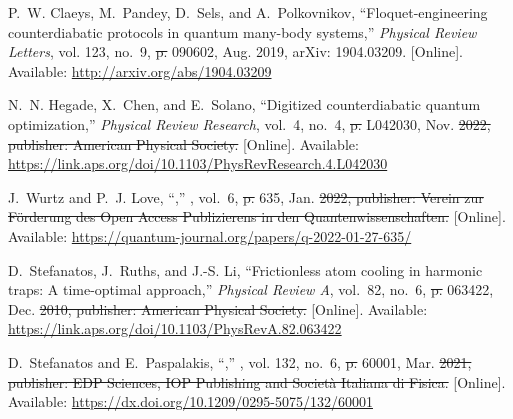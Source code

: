 \documentclass[a4paper,oneside,11pt]{book}
\providecommand{\DIFaddtex}[1]{{\protect\color{blue}\uwave{#1}}} %
\providecommand{\DIFdeltex}[1]{{\protect\color{red}\sout{#1}}}                      %
\providecommand{\DIFaddbegin}{} %
\providecommand{\DIFaddend}{} %
\providecommand{\DIFdelbegin}{} %
\providecommand{\DIFdelend}{} %
\providecommand{\DIFadd}[1]{\texorpdfstring{\DIFaddtex{#1}}{#1}} %
\providecommand{\DIFdel}[1]{\texorpdfstring{\DIFdeltex{#1}}{}} %
\newcommand{\DIFscaledelfig}{0.5}
\newlength{\DIFdelgraphicswidth} %
\newlength{\DIFdelgraphicsheight} %
\newcommand{\DIFaddincludegraphics}[2][]{{\color{blue}\fbox{\DIFOincludegraphics[#1]{#2}}}} %
\newcommand{\DIFdelincludegraphics}[2][]{%
\sbox{\DIFdelgraphicsbox}{\DIFOincludegraphics[#1]{#2}}%
\settoboxwidth{\DIFdelgraphicswidth}{\DIFdelgraphicsbox} %
\settoboxtotalheight{\DIFdelgraphicsheight}{\DIFdelgraphicsbox} %
\scalebox{\DIFscaledelfig}{%
\parbox[b]{\DIFdelgraphicswidth}{\usebox{\DIFdelgraphicsbox}\\[-\baselineskip] \rule{\DIFdelgraphicswidth}{0em}}\llap{\resizebox{\DIFdelgraphicswidth}{\DIFdelgraphicsheight}{%
\setlength{\unitlength}{\DIFdelgraphicswidth}%
\begin{picture}(1,1)%
\thicklines\linethickness{2pt} %
{\color[rgb]{1,0,0}\put(0,0){\framebox(1,1){}}}%
{\color[rgb]{1,0,0}\put(0,0){\line( 1,1){1}}}%
{\color[rgb]{1,0,0}\put(0,1){\line(1,-1){1}}}%
\end{picture}%
}\hspace*{3pt}}} %
} %
\DeclareRobustCommand{\DIFaddbegin}{\DIFOaddbegin \let\includegraphics\DIFaddincludegraphics} %
\DeclareRobustCommand{\DIFaddend}{\DIFOaddend \let\includegraphics\DIFOincludegraphics} %
\DeclareRobustCommand{\DIFdelbegin}{\DIFOdelbegin \let\includegraphics\DIFdelincludegraphics} %
\DeclareRobustCommand{\DIFdelend}{\DIFOaddend \let\includegraphics\DIFOincludegraphics} %
\begin{document}
\begin{thebibliography}{100}
\BIBentryALTinterwordspacing
P.~W. Claeys, M.~Pandey, D.~Sels, and A.~Polkovnikov, ``Floquet-engineering
  counterdiabatic protocols in quantum many-body systems,'' \emph{Physical
  Review Letters}, vol. 123, no.~9,  \DIFdelbegin \DIFdel{p. }\DIFdelend 090602, Aug. 2019, arXiv: 1904.03209.
  [Online]. Available: \url{http://arxiv.org/abs/1904.03209}
\BIBentrySTDinterwordspacing

\BIBentryALTinterwordspacing
N.~N. Hegade, X.~Chen, and E.~Solano, ``Digitized counterdiabatic quantum
  optimization,'' \emph{Physical Review Research}, vol.~4, no.~4,  \DIFdelbegin \DIFdel{p. }\DIFdelend L042030,
  Nov. \DIFdelbegin \DIFdel{2022, publisher: American Physical Society. }\DIFdelend \DIFaddbegin \DIFadd{2022. }\DIFaddend [Online]. Available:
  \url{https://link.aps.org/doi/10.1103/PhysRevResearch.4.L042030}
\BIBentrySTDinterwordspacing

\BIBentryALTinterwordspacing
J.~Wurtz and P.~J. Love, ``,''
  \emph{}, vol.~6,  \DIFdelbegin \DIFdel{p. }\DIFdelend 635, Jan. \DIFdelbegin \DIFdel{2022,
  publisher: Verein zur Förderung des Open Access Publizierens in den
  Quantenwissenschaften. }\DIFdelend \DIFaddbegin \DIFadd{2022.
  }\DIFaddend [Online]. Available:
  \url{https://quantum-journal.org/papers/q-2022-01-27-635/}
\BIBentrySTDinterwordspacing

\BIBentryALTinterwordspacing
D.~Stefanatos, J.~Ruths, and J.-S. Li, ``Frictionless atom cooling in harmonic
  traps: {A} time-optimal approach,'' \emph{Physical Review A}, vol.~82, no.~6,
   \DIFdelbegin \DIFdel{p. }\DIFdelend 063422, Dec. \DIFdelbegin \DIFdel{2010, publisher: American Physical Society. }\DIFdelend \DIFaddbegin \DIFadd{2010. }\DIFaddend [Online]. Available:
  \url{https://link.aps.org/doi/10.1103/PhysRevA.82.063422}
\BIBentrySTDinterwordspacing

\BIBentryALTinterwordspacing
D.~Stefanatos and E.~Paspalakis, ``,''
  \emph{}, vol. 132, no.~6,  \DIFdelbegin \DIFdel{p.
  }\DIFdelend 60001,
  Mar. \DIFdelbegin \DIFdel{2021, publisher: EDP Sciences, IOP Publishing and Società
  Italiana di Fisica. }\DIFdelend \DIFaddbegin \DIFadd{2021. }\DIFaddend [Online]. Available:
  \url{https://dx.doi.org/10.1209/0295-5075/132/60001}
\BIBentrySTDinterwordspacing


\end{thebibliography}
\end{document}
